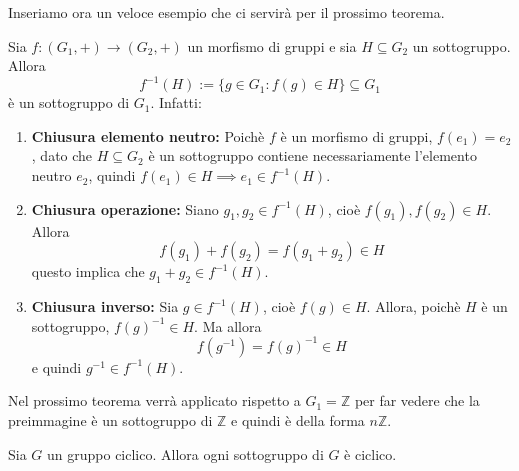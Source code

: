 \documentclass[../main.tex]{subfiles}
\begin{document}
Inseriamo ora un veloce esempio che ci servirà per il prossimo teorema.
\begin{example}
    Sia $f: (G_1, +) \rightarrow (G_2, +)$ un morfismo di gruppi e sia $H \subseteq G_2$ un sottogruppo. Allora
    \[
        f^{-1}(H) := \{g \in G_1 : f(g) \in H\} \subseteq G_1
    \]
    è un sottogruppo di $G_1$. Infatti:
    \begin{enumerate}[label=\roman*)]
        \item \textbf{Chiusura elemento neutro:} Poichè $f$ è un morfismo di gruppi, $f(e_1) = e_2$, dato che $H \subseteq G_2$ è un sottogruppo contiene necessariamente l'elemento neutro $e_2$, quindi $f(e_1) \in H \implies e_1 \in f^{-1}(H)$.
        \item \textbf{Chiusura operazione:} Siano $g_1, g_2 \in f^{-1}(H)$, cioè $f(g_1), f(g_2) \in H$. Allora
              \[
                  f(g_1) + f(g_2) = f(g_1 + g_2) \in H
              \]
              questo implica che $g_1 + g_2 \in f^{-1}(H)$.
        \item \textbf{Chiusura inverso:} Sia $g \in f^{-1}(H)$, cioè $f(g) \in H$. Allora, poichè $H$ è un sottogruppo, $f(g)^{-1} \in H$. Ma allora
              \[
                  f(g^{-1}) = f(g)^{-1} \in H
              \]
              e quindi $g^{-1} \in f^{-1}(H)$.
    \end{enumerate}
\end{example}
Nel prossimo teorema verrà applicato rispetto a $G_1 = \mathbb{Z}$ per far vedere che la preimmagine è un sottogruppo di $\mathbb{Z}$ e quindi è della forma $n \mathbb{Z}$.

\begin{theorem}
    \label{th:1.44}
    Sia $G$ un gruppo ciclico. Allora ogni sottogruppo di $G$ è ciclico.
\end{theorem}
\end{document}
